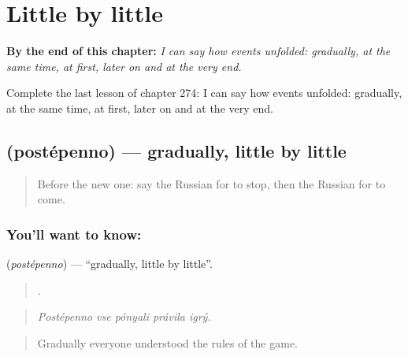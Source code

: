 
\chapter{Little by little}
\label{ch:ru-little-by-little}

\begin{chapteropening}
\textbf{By the end of this chapter:} \emph{I can say how events unfolded: gradually, at the same time, at first, later on and at the very end.}

Complete the last lesson of chapter 274: I can say how events unfolded: gradually, at the same time, at first, later on and at the very end.
\end{chapteropening}

\section[\texorpdfstring{\ru{постепенно} (postépenno)}{постепенно (postépenno)}]{ (postépenno) — gradually, little by little}

\label{lesson:RU-C274-postepenno}



\begin{quote}
Before the new one: say the Russian for to stop, then the Russian for to come.
\end{quote}

\subsection*{You'll want to know: }
\textbf{} (\emph{postépenno}) — \textquotedblleft{}gradually, little by little\textquotedblright{}.

\begin{quote}
    .
\end{quote}

\begin{quote}
\emph{Postépenno vse pónyali právila igrý.}
\end{quote}

\begin{quote}
Gradually everyone understood the rules of the game.
\end{quote}

